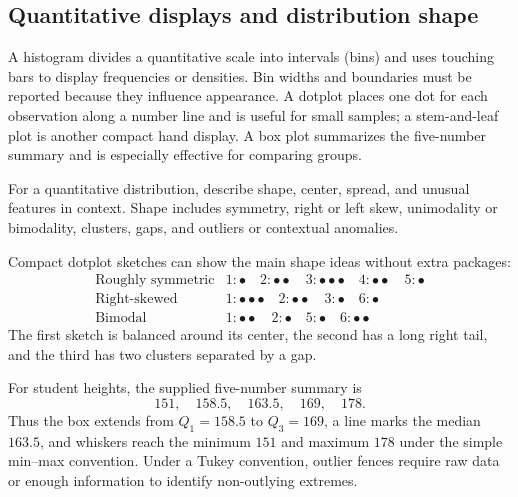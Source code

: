 \documentclass[11pt]{article}
\begin{document}
\subsection{Quantitative displays and distribution shape}
A histogram divides a quantitative scale into intervals (bins) and uses
touching bars to display frequencies or densities.  Bin widths and boundaries
must be reported because they influence appearance.  A dotplot places one dot
for each observation along a number line and is useful for small samples; a
stem-and-leaf plot is another compact hand display.  A box plot summarizes
the five-number summary and is especially effective for comparing groups.

\begin{keybox}
For a quantitative distribution, describe shape, center, spread, and unusual
features in context.  Shape includes symmetry, right or left skew, unimodality
or bimodality, clusters, gaps, and outliers or contextual anomalies.
\end{keybox}

Compact dotplot sketches can show the main shape ideas without extra
packages:
\[
\begin{array}{c|l}
\text{Roughly symmetric} & 1{:}\bullet\quad 2{:}\bullet\bullet\quad 3{:}\bullet\bullet\bullet\quad 4{:}\bullet\bullet\quad 5{:}\bullet \\
\text{Right-skewed} & 1{:}\bullet\bullet\bullet\quad 2{:}\bullet\bullet\quad 3{:}\bullet\quad 6{:}\bullet \\
\text{Bimodal} & 1{:}\bullet\bullet\quad 2{:}\bullet\quad 5{:}\bullet\quad 6{:}\bullet\bullet
\end{array}
\]
The first sketch is balanced around its center, the second has a long right
tail, and the third has two clusters separated by a gap.

For student heights, the supplied five-number summary is
\[
151,\quad158.5,\quad163.5,\quad169,\quad178.
\]
Thus the box extends from $Q_1=158.5$ to $Q_3=169$, a line marks the median
$163.5$, and whiskers reach the minimum $151$ and maximum $178$ under the
simple min--max convention.  Under a Tukey convention, outlier fences require
raw data or enough information to identify non-outlying extremes.
\end{document}
